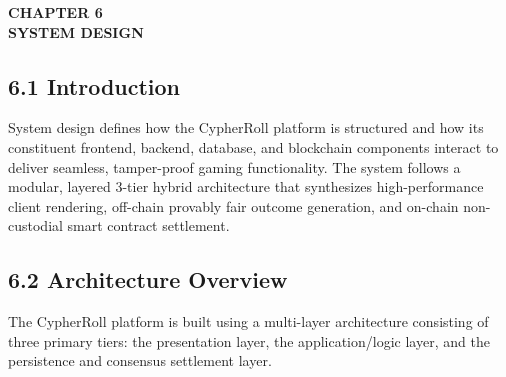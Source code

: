 \vspace*{0.5cm}
\begin{center}
\textbf{CHAPTER 6}\\[0.15cm]
\textbf{SYSTEM DESIGN}
\end{center}
\label{chap:design}
\vspace{0.2cm}

\subsection*{6.1 Introduction}
System design defines how the CypherRoll platform is structured and how its constituent frontend, backend, database, and blockchain components interact to deliver seamless, tamper-proof gaming functionality. The system follows a modular, layered 3-tier hybrid architecture that synthesizes high-performance client rendering, off-chain provably fair outcome generation, and on-chain non-custodial smart contract settlement.

\subsection*{6.2 Architecture Overview}
The CypherRoll platform is built using a multi-layer architecture consisting of three primary tiers: the presentation layer, the application/logic layer, and the persistence and consensus settlement layer.


